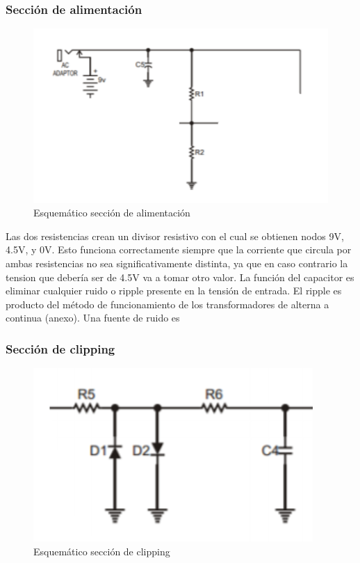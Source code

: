 \documentclass[../../main.tex]{subfiles}
\begin{document}
\subsubsection{Secci\'on de alimentaci\'on}

\begin{figure}[H]	%
	\centering
	\includegraphics[scale=1]{imagenes/esquematico_alimentacion.png}
	\caption{Esquem\'atico secci\'on de alimentaci\'on}
	\label{fig:ej5_esquematico_alimentacion}
\end{figure}

Las dos resistencias crean un divisor resistivo con el cual se obtienen nodos 9V, 4.5V, y 0V. Esto funciona correctamente siempre que la corriente que circula por ambas resistencias no sea significativamente distinta, ya que en caso contrario la tension que deber\'ia ser de 4.5V va a tomar otro valor.
La funci\'on del capacitor es eliminar cualquier ruido o ripple presente en la tensi\'on de entrada. El ripple es producto del m\'etodo de funcionamiento de los transformadores de alterna a continua (anexo). Una fuente de ruido es ~~~

\subsubsection{Secci\'on de clipping}

\begin{figure}[H]	%
	\centering
	\includegraphics[scale=1]{imagenes/esquematico_clipping.png}
	\caption{Esquem\'atico secci\'on de clipping}
	\label{fig:ej5_esquematico_clipping}
\end{figure}
\end{document}
